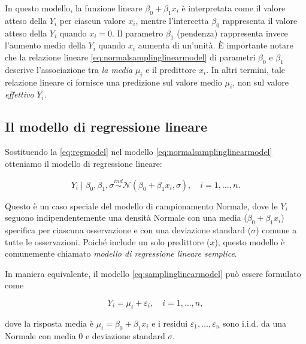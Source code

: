 \documentclass[
  10pt,
  italian,
  a4paper,
  extrafontsizes,onecolumn,openright
  ]{memoir}
\begin{document}
In questo modello, la funzione lineare \(\beta_0 + \beta_ 1 x_i\) è interpretata come il valore atteso della \(Y_i\) per ciascun valore \(x_i\), mentre l'intercetta \(\beta_0\) rappresenta il valore atteso della \(Y_i\) quando \(x_i = 0\). Il parametro \(\beta_ 1\) (pendenza) rappresenta invece l'aumento medio della \(Y_i\) quando \(x_i\) aumenta di un'unità. È importante notare che la relazione lineare \eqref{eq:normalsamplinglinearmodel} di parametri \(\beta_0\) e \(\beta_ 1\) descrive l'associazione tra \emph{la media} \(\mu_i\) e il predittore \(x_i\). In altri termini, tale relazione lineare ci fornisce una predizione sul valore medio \(\mu_i\), non sul valore \emph{effettivo} \(Y_i\).

\hypertarget{il-modello-di-regressione-lineare}{%
\subsection{Il modello di regressione lineare}\label{il-modello-di-regressione-lineare}}

Sostituendo la \eqref{eq:regmodel} nel modello \eqref{eq:normalsamplinglinearmodel} otteniamo il modello di regressione lineare:

\begin{equation}
Y_i \mid \beta_0, \beta_ 1, \sigma \stackrel{ind}{\sim} \mathcal{N}(\beta_0 + \beta_ 1 x_i, \sigma), \quad i = 1, \dots, n.
\label{eq:samplinglinearmodel}
\end{equation}

Questo è un caso speciale del modello di campionamento Normale, dove le \(Y_i\) seguono indipendentemente una densità Normale con una media (\(\beta_0 + \beta_ 1 x_i\)) specifica per ciascuna osservazione e con una deviazione standard (\(\sigma\)) comune a tutte le osservazioni. Poiché include un solo predittore (\(x\)), questo modello è comunemente chiamato \emph{modello di regressione lineare semplice}.

In maniera equivalente, il modello \eqref{eq:samplinglinearmodel} può essere formulato come

\begin{equation}
Y_i = \mu_i + \varepsilon_i, \quad i = 1, \dots, n,
\label{eq:samplinglinearmodel2}
\end{equation}

dove la risposta media è \(\mu_i = \beta_0 + \beta_ 1 x_i\) e i residui \(\varepsilon_1, \dots, \varepsilon_n\) sono i.i.d. da una Normale con media 0 e deviazione standard \(\sigma\).
\end{document}
